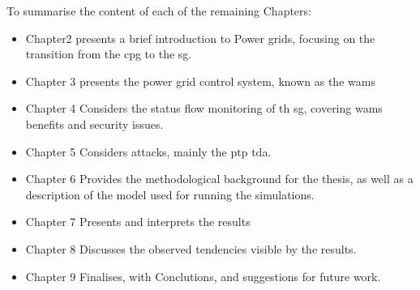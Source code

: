 To summarise the content of each of the remaining Chapters:
\begin{itemize}
    \item Chapter2 presents a brief introduction to Power grids, focusing on the transition from the \acrlong{cpg} to the \acrlong{sg}.
    \item Chapter 3 presents the power grid control system, known as the \acrfull{wams}
    \item Chapter 4 Considers the status flow monitoring of th \acrlong{sg}, covering \acrshort{wams} benefits and security issues.
    \item Chapter 5 Considers attacks, mainly the \acrshort{ptp} \acrlong{tda}.
    \item Chapter 6 Provides the methodological background for the thesis, as well as a description of the model used for running the simulations.
    \item Chapter 7 Presents and interprets the results
    \item Chapter 8 Discusses the observed tendencies visible by the results.
    \item Chapter 9 Finalises, with Conclutions, and suggestions for future work.
\end{itemize}
 
